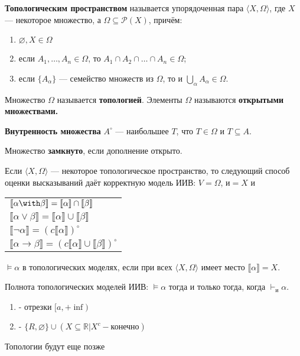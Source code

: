  \textbf{Топологическим пространством} называется упорядоченная пара $\langle X, \Omega \rangle$,
где $X$ --- некоторое множество, а $\Omega \subseteq \mathcal{P}(X)$, причём:
\begin{enumerate}
\item $\varnothing, X \in \Omega$
\item если $A_1, \dots, A_n \in \Omega$, то $A_1 \cap A_2 \cap \dots \cap A_n \in \Omega$;
\item если $\{A_\alpha\}$ --- семейство множеств из $\Omega$, то и $\bigcup_\alpha A_\alpha \in \Omega$.
\end{enumerate}

Множество $\Omega$ называется \textbf{топологией}.
Элементы $\Omega$ называются \textbf{открытыми множествами.}

 \textbf{Внутренность множества} $A^\circ$ --- наибольшее $T$, что $T \in \Omega$ и $T \subseteq A$. 

 Множество \textbf{замкнуто}, если дополнение открыто.


 Если $\langle X, \Omega\rangle$ --- некоторое топологическое пространство, то следующий способ оценки высказываний
даёт корректную модель ИИВ: $V = \Omega$, $\text{и} = X$ и 
\begin{tabular}{l}
$\llbracket \alpha \with \beta \rrbracket = \llbracket \alpha \rrbracket \cap \llbracket \beta \rrbracket$\\
$\llbracket \alpha \vee \beta \rrbracket = \llbracket \alpha \rrbracket \cup \llbracket \beta \rrbracket$\\
$\llbracket \neg\alpha \rrbracket = (c\llbracket \alpha \rrbracket)^\circ$\\
$\llbracket \alpha \rightarrow \beta \rrbracket = (c\llbracket \alpha \rrbracket \cup \llbracket \beta \rrbracket)^\circ$
\end{tabular}

$\models\alpha$ в топологических моделях, если при всех $\langle X,\Omega\rangle$ имеет место $\llbracket \alpha \rrbracket = X$.

Полнота топологических моделей ИИВ: $\models\alpha$ тогда и только тогда, когда $\vdash_\text{и}\alpha$.




\begin{enumerate}
    \item {} - отрезки $[a, +\inf)$
    \item  {} - $\{R, \varnothing\} \cup (X \subseteq \mathbb{R} | X^c - \text{конечно})$
    
\end{enumerate}

Топологии будут еще позже